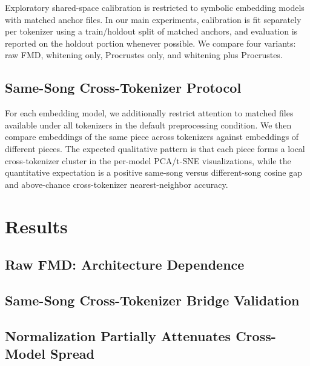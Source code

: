 \documentclass[a4paper]{article}
\begin{document}
Exploratory shared-space calibration is restricted to symbolic embedding models with matched anchor files. In our main experiments, calibration is fit separately per tokenizer using a train/holdout split of matched anchors, and evaluation is reported on the holdout portion whenever possible. We compare four variants: raw FMD, whitening only, Procrustes only, and whitening plus Procrustes.

\subsection{Same-Song Cross-Tokenizer Protocol}

For each embedding model, we additionally restrict attention to matched files available under all tokenizers in the default preprocessing condition. We then compare embeddings of the same piece across tokenizers against embeddings of different pieces. The expected qualitative pattern is that each piece forms a local cross-tokenizer cluster in the per-model PCA/t-SNE visualizations, while the quantitative expectation is a positive same-song versus different-song cosine gap and above-chance cross-tokenizer nearest-neighbor accuracy.

\section{Results}
\label{sec:results}


\subsection{Raw FMD: Architecture Dependence}


\subsection{Same-Song Cross-Tokenizer Bridge Validation}


\subsection{Normalization Partially Attenuates Cross-Model Spread}
\end{document}
